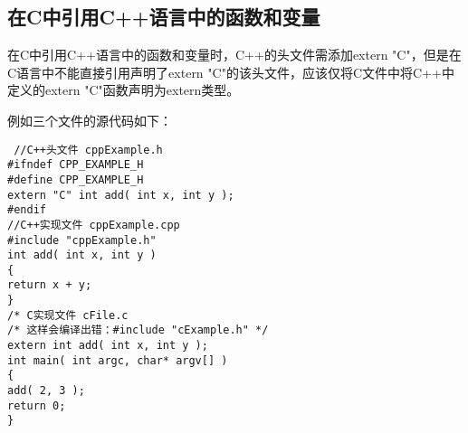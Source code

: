 \subsection{在C中引用C++语言中的函数和变量}
在C中引用C++语言中的函数和变量时，C++的头文件需添加extern "C"，但是在C语言中不能直接引用声明了extern "C"的该头文件，应该仅将C文件中将C++中定义的extern "C"函数声明为extern类型。

例如三个文件的源代码如下：
\begin{lstlisting}
 //C++头文件 cppExample.h
#ifndef CPP_EXAMPLE_H
#define CPP_EXAMPLE_H
extern "C" int add( int x, int y );
#endif
//C++实现文件 cppExample.cpp
#include "cppExample.h"
int add( int x, int y )
{
return x + y;
}
/* C实现文件 cFile.c
/* 这样会编译出错：#include "cExample.h" */
extern int add( int x, int y );
int main( int argc, char* argv[] )
{
add( 2, 3 ); 
return 0;
}
\end{lstlisting} 

